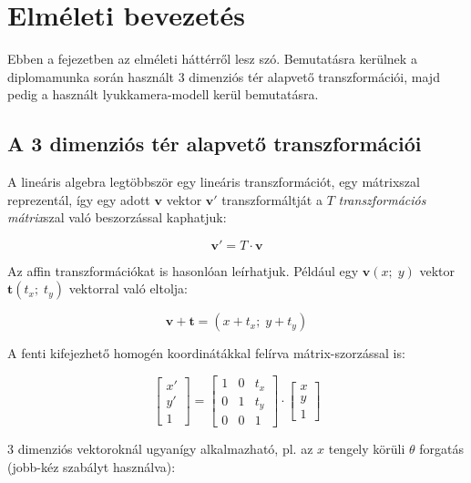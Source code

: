 \chapter{Elméleti bevezetés}\label{ch:elmelet}

Ebben a fejezetben az elméleti háttérről lesz szó. Bemutatásra kerülnek a diplomamunka során használt 3 dimenziós tér alapvető transzformációi, majd pedig a használt lyukkamera-modell kerül bemutatásra.

\section{A 3 dimenziós tér alapvető transzformációi}

A lineáris algebra legtöbbször egy lineáris transzformációt, egy mátrixszal reprezentál, így egy adott $\mathbf{v}$ vektor $\mathbf{v}'$ transzformáltját a $T$ \textit{transzformációs mátrix}szal való beszorzással kaphatjuk:

\[\mathbf{v}' = T\cdot \mathbf{v}\]

Az affin transzformációkat is hasonlóan leírhatjuk. Például egy $\mathbf{v}(x;\; y)$ vektor $\mathbf{t}(t_x;\; t_y)$ vektorral való eltolja:

\[\mathbf{v} + \mathbf{t} = (x + t_x;\; y + t_y)\]

A fenti kifejezhető homogén koordinátákkal felírva mátrix-szorzással is:

\[\left[\begin{array}{c}x' \\y'\\ 1 \end{array}\right] = \left[\begin{array}{ccc}1 & 0 & t_x\\0 & 1 & t_y\\ 0 & 0 & 1\end{array}\right] \cdot \left[\begin{array}{c}x \\y\\ 1 \end{array}\right]\]

3 dimenziós vektoroknál ugyanígy alkalmazható, pl. az $x$ tengely körüli $\theta$ forgatás (jobb-kéz szabályt használva):

